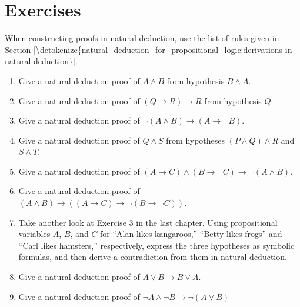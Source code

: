 \documentclass[letterpaper,10pt,english]{sphinxmanual}
\begin{document}
\section{Exercises}
\label{\detokenize{natural_deduction_for_propositional_logic:exercises}}
\sphinxAtStartPar
When constructing proofs in natural deduction, use  the list of
rules given in \hyperref[\detokenize{natural_deduction_for_propositional_logic:derivations-in-natural-deduction}]{Section \ref{\detokenize{natural_deduction_for_propositional_logic:derivations-in-natural-deduction}}}.
\begin{enumerate}
%
\item {} 
\sphinxAtStartPar
Give a natural deduction proof of \(A \wedge B\) from hypothesis \(B \wedge A\).

\item {} 
\sphinxAtStartPar
Give a natural deduction proof of \((Q \to R) \to R\) from hypothesis \(Q\).

\item {} 
\sphinxAtStartPar
Give a natural deduction proof of \(\neg (A \wedge B) \to (A \to \neg B)\).

\item {} 
\sphinxAtStartPar
Give a natural deduction proof of \(Q \wedge S\) from hypotheses \((P \wedge Q) \wedge R\) and \(S \wedge T\).

\item {} 
\sphinxAtStartPar
Give a natural deduction proof of \((A \to C) \wedge (B \to \neg C) \to \neg (A \wedge B)\).

\item {} 
\sphinxAtStartPar
Give a natural deduction proof of \((A \wedge B) \to ((A \to C) \to \neg (B \to \neg C))\).

\item {} 
\sphinxAtStartPar
Take another look at Exercise 3 in the last chapter. Using propositional variables \(A\), \(B\), and \(C\) for “Alan likes kangaroos,” “Betty likes frogs” and “Carl likes hamsters,” respectively, express the three hypotheses as symbolic formulas, and then derive a contradiction from them in natural deduction.

\item {} 
\sphinxAtStartPar
Give a natural deduction proof of \(A \vee B \to B \vee A\).

\item {} 
\sphinxAtStartPar
Give a natural deduction proof of \(\neg A \wedge \neg B \to \neg (A \vee B)\)


\end{enumerate}
\end{document}
